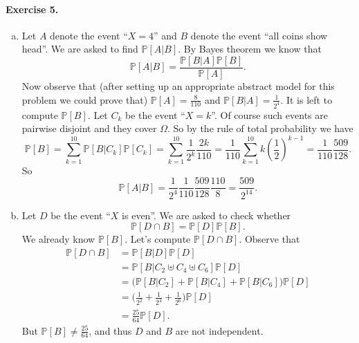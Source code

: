 \documentclass[12pt,a4paper]{report}
\theoremstyle{definition}
\theoremstyle{num.custom-title}
\renewcommand{\1}{\mathbbm{1}}
\renewcommand{\P}{\mathbb{P}}
\begin{document}
\paragraph{Exercise 5.}
\begin{enumerate}[(a)]
\item Let $A$ denote the event ``$X=4$'' and $B$ denote the event ``all coins show head''. We are asked to find $\P[A|B]$. By Bayes theorem we know that
\[
\P[A|B] = \frac{\P[B|A] \P[B]}{\P[A]}.
\]
Now observe that (after setting up an appropriate abstract model for this problem we could prove that) $\P[A] = \frac{8}{110}$ and $\P[B|A] = \frac{1}{2^4}$. It is left to compute $\P[B]$. Let $C_k$ be the event ``$X=k$''. Of course such events are pairwise disjoint and they cover $\Omega$. So by the rule of total probability we have
\[
\P[B] = \sum_{k=1}^{10} \P[B|C_k] \P[C_k] = \sum_{k=1}^{10} \frac{1}{2^k} \frac{2k}{110} = \frac{1}{110} \sum_{k=1}^{10} k \left( \frac{1}{2} \right)^{k-1} = \frac{1}{110} \frac{509}{128}.
\]
So
\[
\P[A|B] = \frac{1}{2^4} \frac{1}{110} \frac{509}{128} \frac{110}{8} = \frac{509}{2^{14}}.
\]
\item Let $D$ be the event ``$X$ is even''. We are asked to check whether
\[
\P[D \cap B] = \P[D] \P[B].
\]
We already know $\P[B]$. Let's compute $\P[D \cap B]$. Observe that
\begin{align*}
\P[D \cap B] 
&= \P[B|D] \P[D] \\
&= \P[B | C_2 \uplus C_4 \uplus C_6] \P[D] \\ 
&= \Big( \P[B | C_2] + \P[B | C_4] + \P[B | C_6] \Big) \P[D] \tag{immediate to check} \\
&= \Big( \frac{1}{2^2} + \frac{1}{2^4} + \frac{1}{2^6} \Big) \P[D] \\
&= \frac{25}{64} \P[D].
\end{align*}
But $\P[B] \neq \frac{25}{64}$, and thus $D$ and $B$ are not independent.
\end{enumerate}
\end{document}
